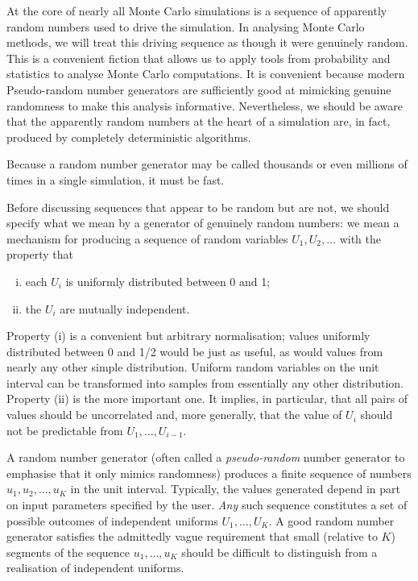 At the core of nearly all Monte Carlo simulations is a sequence of apparently random numbers used to drive the simulation. In analysing Monte Carlo methods, we will treat this driving sequence as though it were genuinely random. This is a convenient fiction that allows us to apply tools from probability and statistics to analyse Monte Carlo computations. It is convenient because modern Pseudo-random number generators are sufficiently good at mimicking genuine randomness to make this analysis informative. Nevertheless, we should be aware that the apparently random numbers at the heart of a simulation are, in fact, produced by completely deterministic algorithms.

Because a random number generator may be called thousands or even millions of times in a single simulation, it must be fast.

Before discussing sequences that appear to be random but are not, we should specify what we mean by a generator of genuinely random numbers: we mean a mechanism for producing a sequence of random variables $U_1, U_2, \dots$ with the property that
\begin{enumerate}[(i)]
	\item each $U_i$ is uniformly distributed between 0 and 1;
	\item the $U_i$ are mutually independent.
\end{enumerate}

Property (i) is a convenient but arbitrary normalisation; values uniformly distributed between 0 and 1/2 would be just as useful, as would values from nearly any other simple distribution. Uniform random variables on the unit interval can be transformed into samples from essentially any other distribution. Property (ii) is the more important one. It implies, in particular, that all pairs of values should be uncorrelated and, more generally, that the value of $U_i$ should not be predictable from $U_1, \dots, U_{i-1}$.

A random number generator (often called a \textit{pseudo-random} number generator to emphasise that it only mimics randomness) produces a finite sequence of numbers $u_1, u_2, \dots, u_K$ in the unit interval. Typically, the values generated depend in part on input parameters specified by the user. \textit{Any} such sequence constitutes a set of possible outcomes of independent uniforms $U_1, \dots, U_K$. A good random number generator satisfies the admittedly vague requirement that small (relative to $K$) segments of the sequence $u_1, \dots, u_K$ should be difficult to distinguish from a realisation of independent uniforms.

